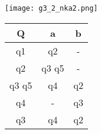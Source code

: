 \documentclass{article}
\begin{document}
\begin{enumerate}
\begin{flushleft}
        \texttt{[image: g3\_2\_nka2.png]}
    \end{flushleft}
    \begin{tabular}{|c|c|c|}
        \hline
         Q          & a             & b     \\ \hline
         q1         & q2            & -     \\
         q2         & q3 q5         & -     \\
         q3 q5      & q4            & q2    \\ 
         q4         & -             & q3    \\
         q3         & q4            & q2    \\ \hline
    \end{tabular} \\
    

\end{enumerate}
\end{document}
